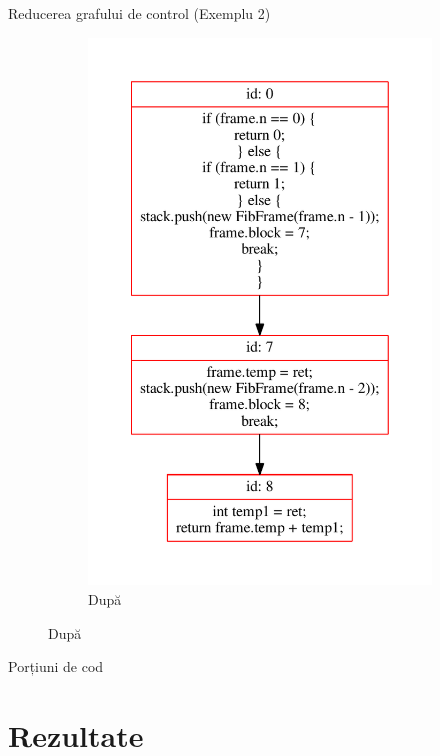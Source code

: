 \documentclass{beamer}
\begin{document}
\begin{frame}{Reducerea grafului de control (Exemplu 2)}
\begin{figure}[htb]
\begin{subfigure}[b]{.4\textwidth}
            \includegraphics[width=\textwidth]{../../../theses/diploma/src/graph/inline-after.pdf}
            \caption{După}
        \end{subfigure}
    \end{figure}
\end{frame}

\begin{frame}{Porțiuni de cod}
	
\end{frame}
	
\section{Rezultate}
\end{document}
